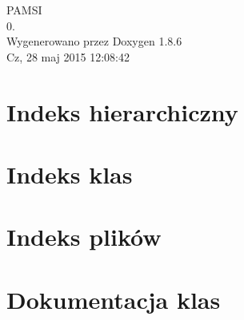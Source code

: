 \documentclass[twoside]{book}
\newcommand{\clearemptydoublepage}{%
  \newpage{\pagestyle{empty}\cleardoublepage}%
}
\begin{document}
\hypersetup{pageanchor=false}
\begin{titlepage}
\vspace*{7cm}
\begin{center}%
{\Large P\-A\-M\-S\-I \\[1ex]\large 0. }\\
\vspace*{1cm}
{\large Wygenerowano przez Doxygen 1.8.6}\\
\vspace*{0.5cm}
{\small Cz, 28 maj 2015 12:08:42}\\
\end{center}
\end{titlepage}
\clearemptydoublepage
\tableofcontents
\clearemptydoublepage
{}
\hypersetup{pageanchor=true}

\chapter{Indeks hierarchiczny}

\chapter{Indeks klas}

\chapter{Indeks plików}

\chapter{Dokumentacja klas}




















\end{document}
